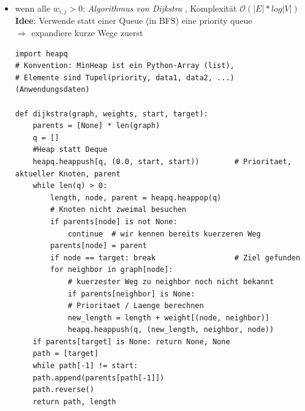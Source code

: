 \documentclass[11pt, fleqn]{scrreprt}
\newcommand{\bigO}[0]{\mathcal{O}}
\begin{document}
        \begin{itemize}
        \item wenn alle $w_{i, j} > 0$: \emph{Algorithmus von Dijkstra} , Komplexität $\bigO{}(|E| * log|V|)$ \\
        \textbf{Idee}: Verwende statt einer Queue (in BFS) eine priority queue \\
        $\Rightarrow$ expandiere kurze Wege zuerst
        \begin{verbatim}
import heapq
# Konvention: MinHeap ist ein Python-Array (list),
# Elemente sind Tupel(priority, data1, data2, ...) (Anwendungsdaten)

def dijkstra(graph, weights, start, target):
    parents = [None] * len(graph)
    q = []
    #Heap statt Deque
    heapq.heappush[q, (0.0, start, start))        # Prioritaet, aktueller Knoten, parent
    while len(q) > 0:
        length, node, parent = heapq.heappop(q)
        # Knoten nicht zweimal besuchen
        if parents[node] is not None:
            continue  # wir kennen bereits kuerzeren Weg
        parents[node] = parent
        if node == target: break                  # Ziel gefunden
        for neighbor in graph[node]:
            # kuerzester Weg zu neighbor noch nicht bekannt
            if parents[neighbor] is None:
            # Prioritaet / Laenge berechnen
            new_length = length + weight[(node, neighbor)]
            heapq.heappush(q, (new_length, neighbor, node))
    if parents[target] is None: return None, None
    path = [target]
    while path[-1] != start:
    path.append(parents[path[-1]])
    path.reverse()
    return path, length
        \end{verbatim}
        \end{itemize}
\end{document}
